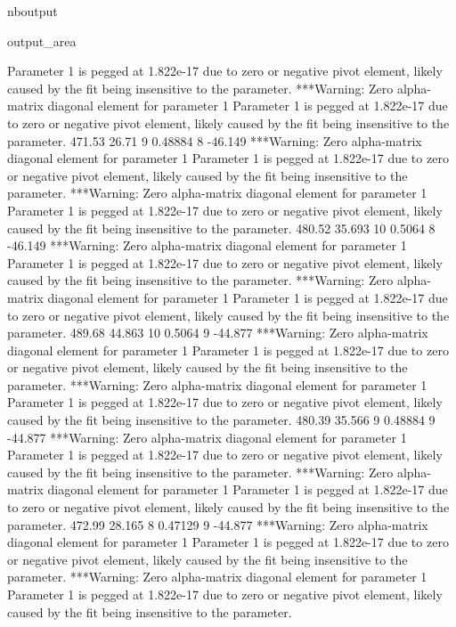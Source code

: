 \documentclass[letterpaper,10pt,english]{sphinxmanual}
\begin{document}
\begin{sphinxuseclass}{nboutput}
{\begin{sphinxuseclass}{output_area}
\begin{sphinxuseclass}{}
\begin{sphinxVerbatim}[commandchars=\\\{\}]
 Parameter 1 is pegged at 1.822e-17 due to zero or negative pivot element, likely
 caused by the fit being insensitive to the parameter.
***Warning: Zero alpha-matrix diagonal element for parameter 1
 Parameter 1 is pegged at 1.822e-17 due to zero or negative pivot element, likely
 caused by the fit being insensitive to the parameter.
          471.53       26.71    9     0.48884    8     -46.149
***Warning: Zero alpha-matrix diagonal element for parameter 1
 Parameter 1 is pegged at 1.822e-17 due to zero or negative pivot element, likely
 caused by the fit being insensitive to the parameter.
***Warning: Zero alpha-matrix diagonal element for parameter 1
 Parameter 1 is pegged at 1.822e-17 due to zero or negative pivot element, likely
 caused by the fit being insensitive to the parameter.
          480.52      35.693   10      0.5064    8     -46.149
***Warning: Zero alpha-matrix diagonal element for parameter 1
 Parameter 1 is pegged at 1.822e-17 due to zero or negative pivot element, likely
 caused by the fit being insensitive to the parameter.
***Warning: Zero alpha-matrix diagonal element for parameter 1
 Parameter 1 is pegged at 1.822e-17 due to zero or negative pivot element, likely
 caused by the fit being insensitive to the parameter.
          489.68      44.863   10      0.5064    9     -44.877
***Warning: Zero alpha-matrix diagonal element for parameter 1
 Parameter 1 is pegged at 1.822e-17 due to zero or negative pivot element, likely
 caused by the fit being insensitive to the parameter.
***Warning: Zero alpha-matrix diagonal element for parameter 1
 Parameter 1 is pegged at 1.822e-17 due to zero or negative pivot element, likely
 caused by the fit being insensitive to the parameter.
          480.39      35.566    9     0.48884    9     -44.877
***Warning: Zero alpha-matrix diagonal element for parameter 1
 Parameter 1 is pegged at 1.822e-17 due to zero or negative pivot element, likely
 caused by the fit being insensitive to the parameter.
***Warning: Zero alpha-matrix diagonal element for parameter 1
 Parameter 1 is pegged at 1.822e-17 due to zero or negative pivot element, likely
 caused by the fit being insensitive to the parameter.
          472.99      28.165    8     0.47129    9     -44.877
***Warning: Zero alpha-matrix diagonal element for parameter 1
 Parameter 1 is pegged at 1.822e-17 due to zero or negative pivot element, likely
 caused by the fit being insensitive to the parameter.
***Warning: Zero alpha-matrix diagonal element for parameter 1
 Parameter 1 is pegged at 1.822e-17 due to zero or negative pivot element, likely
 caused by the fit being insensitive to the parameter.

\end{sphinxVerbatim}
\end{sphinxuseclass}
\end{sphinxuseclass}}
\end{sphinxuseclass}
\end{document}
